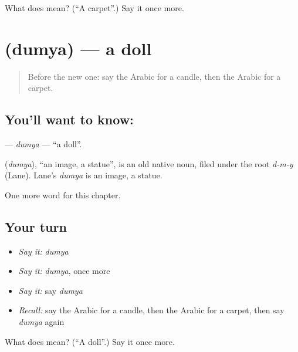 \begin{tcolorbox}[breakable,colback=teal!4,colframe=teal!35!black,title={Before you move on}]
What does  mean? (\textquotedblleft{}A carpet\textquotedblright{}.) Say it once more.
\end{tcolorbox}
\section[\texorpdfstring{\ar{دمية} (dumya)}{دمية (dumya)}]{ (dumya) — a doll}

\label{lesson:AR-C126-dumya}



\begin{quote}
Before the new one: say the Arabic for a candle, then the Arabic for a carpet.
\end{quote}

\subsection*{You'll want to know: }
\textbf{} — \emph{dumya} — \textquotedblleft{}a doll\textquotedblright{}.

\begin{cousinweb}
\textbf{} (\emph{dumya}), \textquotedblleft{}an image, a statue\textquotedblright{}, is an old native noun, filed under the root \emph{d-m-y} (Lane). Lane's \emph{dumya} is an image, a statue.
\end{cousinweb}

\begin{grammarlens}[title={What you've built}]
One more word for this chapter.
\end{grammarlens}

\subsection*{Your turn}
\begin{itemize}
\raggedright
  \item \emph{Say it:} \emph{dumya}
  \item \emph{Say it:} \emph{dumya}, once more
  \item \emph{Say it:} say \emph{dumya}
  \item \emph{Recall:} say the Arabic for a candle, then the Arabic for a carpet, then say \emph{dumya} again
\end{itemize}

\begin{tcolorbox}[breakable,colback=teal!4,colframe=teal!35!black,title={Before you move on}]
What does  mean? (\textquotedblleft{}A doll\textquotedblright{}.) Say it once more.
\end{tcolorbox}
